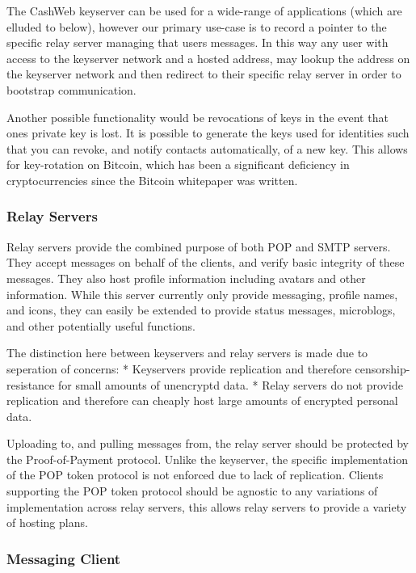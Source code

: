 \documentclass{article}
\begin{document}
The CashWeb keyserver can be used for a wide-range of applications (which are elluded to below), however our primary use-case is to record a pointer to the specific relay server managing that users messages. In this way any user with access to the keyserver network and a hosted address, may lookup the address on the keyserver network and then redirect to their specific relay server in order to bootstrap communication. 

Another possible functionality would be revocations of keys in the event that ones private key is lost. It is possible to generate the keys used for identities such that you can revoke, and notify contacts automatically, of a new key. This allows for key-rotation on Bitcoin, which has been a significant deficiency in cryptocurrencies since the Bitcoin whitepaper was written.

\subsubsection{Relay Servers}

Relay servers provide the combined purpose of both POP and SMTP servers. They accept messages on behalf of the clients, and verify basic integrity of these messages. They also host profile information including avatars and other information. While this server currently only provide messaging, profile names, and icons, they can easily be extended to provide status messages, microblogs, and other potentially useful functions.

The distinction here between keyservers and relay servers is made due to seperation of concerns:
* Keyservers provide replication and therefore censorship-resistance for small amounts of unencryptd data.
* Relay servers do not provide replication and therefore can cheaply host large amounts of encrypted personal data.

Uploading to, and pulling messages from, the relay server should be protected by the Proof-of-Payment protocol. Unlike the keyserver, the specific implementation of the POP token protocol is not enforced due to lack of replication. Clients supporting the POP token protocol should be agnostic to any variations of implementation across relay servers, this allows relay servers to provide a variety of hosting plans.

\subsubsection{Messaging Client}
\end{document}

